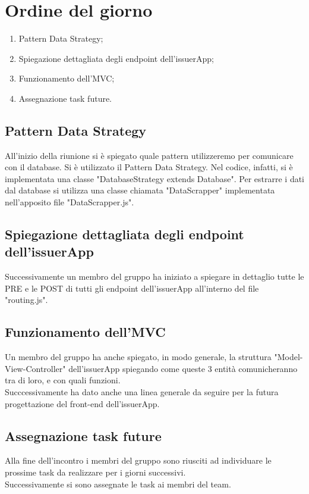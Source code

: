 \section{Ordine del giorno}
\begin{enumerate}
\item Pattern Data Strategy;
\item Spiegazione dettagliata degli endpoint dell'issuerApp;
\item Funzionamento dell'MVC;
\item Assegnazione task future.
\end{enumerate}

\subsection{Pattern Data Strategy}
All'inizio della riunione si è spiegato quale pattern utilizzeremo per comunicare con il database. Si è utilizzato il Pattern Data Strategy. Nel codice, infatti, si è implementata una classe "DatabaseStrategy extends Database". Per estrarre i dati dal database si utilizza una classe chiamata "DataScrapper" implementata nell'apposito file "DataScrapper.js".

\subsection{Spiegazione dettagliata degli endpoint dell'issuerApp}
Successivamente un membro del gruppo ha iniziato a spiegare in dettaglio tutte le PRE e le POST di tutti gli endpoint dell'issuerApp all'interno del file "routing.js".

\subsection{Funzionamento dell'MVC}
Un membro del gruppo ha anche spiegato, in modo generale, la struttura "Model-View-Controller" dell'issuerApp spiegando come queste 3 entità comunicheranno tra di loro, e con quali funzioni.\\
Succcessivamente ha dato anche una linea generale da seguire per la futura progettazione del front-end dell'issuerApp. 

\subsection{Assegnazione task future}
Alla fine dell'incontro i membri del gruppo sono riusciti ad individuare le prossime task da realizzare per i giorni successivi.\\
Successivamente si sono assegnate le task ai membri del team.
